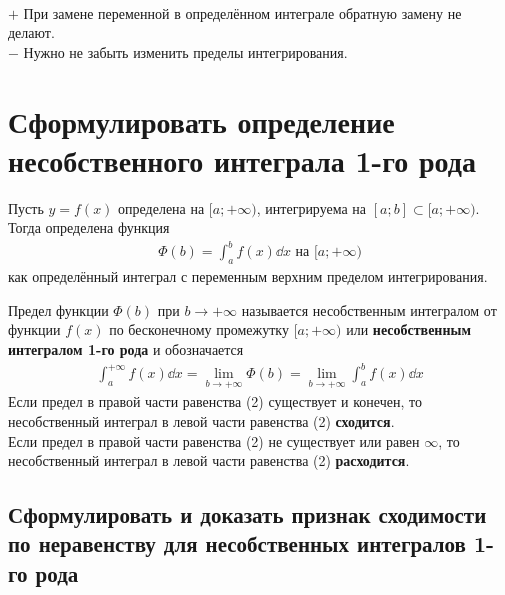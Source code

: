 \begin{remark}\ \\
    \textcircled{$+$} При замене переменной в определённом интеграле обратную замену не делают. \\
    \textcircled{$-$} Нужно не забыть изменить пределы интегрирования.
\end{remark}

\section{Сформулировать определение несобственного интеграла 1-го рода} 
\setcounter{equation}{0}
Пусть $y = f(x)$ определена на $[a; +\infty)$, интегрируема на $[a;b]\subset [a; +\infty)$. Тогда определена функция
\begin{gather}
    \boxed{\Phi (b) = \int_{a}^{b} f(x)\dd{x}} \text{ на } [a; +\infty)
\end{gather}
как определённый интеграл с переменным верхним пределом интегрирования.\\
\begin{definition}
    Предел функции $\Phi(b)$ при $b\to +\infty$ называется несобственным интегралом от функции $f(x)$ по бесконечному промежутку $[a; +\infty)$ или \textbf{несобственным интегралом 1-го рода} и обозначается
    \begin{gather}
        \boxed{\int_{a}^{+\infty} f(x)\dd{x} = \lim_{b \to +\infty} \Phi(b) = \lim\limits_{b \to +\infty} \int_{a}^{b}f(x)\dd{x}} 
    \end{gather}
    Если предел в правой части равенства (2) существует и конечен, то несобственный интеграл в левой части равенства (2) \textbf{сходится}.\\
    Если предел в правой части равенства (2) не существует или равен $\infty$, то несобственный интеграл в левой части равенства (2) \textbf{расходится}.
\end{definition}

\newpage
\subsection{Сформулировать и доказать признак сходимости по неравенству для несобственных интегралов 1-го рода}

